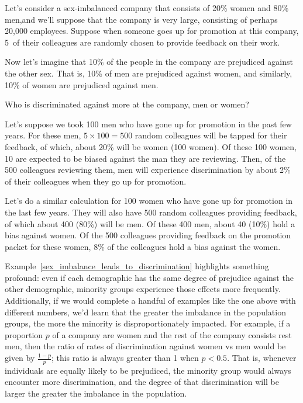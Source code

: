\begin{examplewrap}
\begin{nexample}{Let's consider a sex-imbalanced
    company that consists of 20\% women
    and 80\% men,\footnotemark and we'll suppose that the
    company is very large, consisting of perhaps
    20,000 employees.
    Suppose when someone goes up for promotion at this
    company, 5~of their colleagues are randomly chosen
    to provide feedback on their work.
    \exspace{}

    Now let's imagine that 10\% of the people in the
    company are prejudiced against the other sex.
    That is, 10\% of men are prejudiced against women,
    and similarly, 10\% of women are prejudiced against men.
    \exspace{}
    
    Who is discriminated against more at the company,
    men or women?}
  \label{sex_imbalance_leads_to_discrimination}%
  Let's suppose we took 100 men who have gone up for
  promotion in the past few years.
  For these men, $5 \times 100 = 500$ random colleagues
  will be tapped for their feedback, of which,
  about 20\% will be women (100 women).
  Of these 100 women, 10 are expected to be biased
  against the man they are reviewing.
  Then, of the 500 colleagues reviewing them,
  men will experience
  discrimination by about 2\% of their colleagues when
  they go up for promotion.

  Let's do a similar calculation for 100 women
  who have gone up for promotion in the last few years.
  They will also have 500 random colleagues providing
  feedback, of which about 400 (80\%) will be men.
  Of these 400 men, about 40 (10\%) hold a bias against
  women.
  Of the 500 colleagues providing feedback on the
  promotion packet for these women, 8\% of the
  colleagues hold a bias against the women.
\end{nexample}
\end{examplewrap}

Example~\ref{sex_imbalance_leads_to_discrimination}
highlights something profound:
even if each demographic has the same degree of prejudice
against the other demographic, minority groups
experience those effects more frequently.
Additionally, if we would complete a handful of examples
like the one above with different numbers,
we'd learn that the greater the imbalance
in the population groups, the more the minority
is disproportionately impacted.
For example, if a proportion $p$ of a company are
women and the rest of the company consists rest men,
then the ratio of rates of discrimination against women
vs men would be given by $\frac{1 - p}{p}$;
this ratio is always greater than 1 when $p < 0.5$.
That is, whenever individuals are equally likely to
be prejudiced, the minority group would always encounter
more discrimination, and the degree of that discrimination
will be larger the greater the imbalance in the population.

